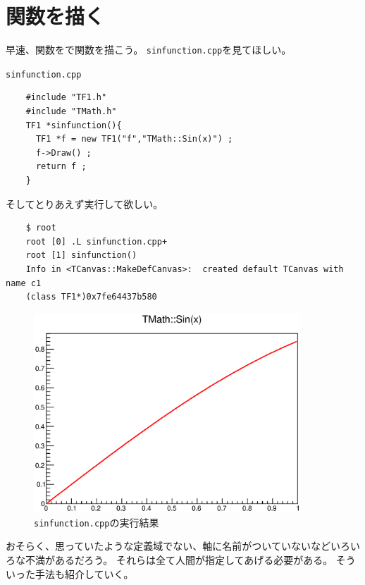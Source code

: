 \clearpage
 \section{関数を描く}
 早速、関数を\ROOT で関数を描こう。
 \verb|sinfunction.cpp|を見てほしい。
 \begin{itembox}{\texttt{sinfunction.cpp}}
\begin{verbatim}
	#include "TF1.h"
	#include "TMath.h"
	TF1 *sinfunction(){
	  TF1 *f = new TF1("f","TMath::Sin(x)") ;
	  f->Draw() ;
	  return f ;
	}
\end{verbatim}
 \end{itembox}
 そしてとりあえず実行して欲しい。
\begin{verbatim}
	$ root
	root [0] .L sinfunction.cpp+
	root [1] sinfunction()
	Info in <TCanvas::MakeDefCanvas>:  created default TCanvas with name c1
	(class TF1*)0x7fe64437b580
\end{verbatim}
\begin{figure}[htbp]
 \begin{center}
  \includegraphics[width = 100mm]{./picture/sinfunctioncanvas1.eps}
 \end{center}
 \caption{\texttt{sinfunction.cpp}の実行結果}
 \label{Fig:sinfunctioncanvas1}
\end{figure}
おそらく、思っていたような定義域でない、軸に名前がついていないなどいろいろな不満があるだろう。
それらは全て人間が指定してあげる必要がある。
そういった手法も紹介していく。



